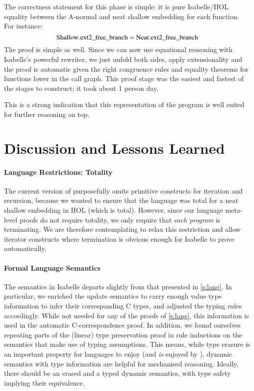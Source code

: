 \documentclass[9pt\ifFinal\else,preprint,nocopyrightspace\fi,\ifAlpha\else natbib,authoryear\fi]{sigplanconf}
\begin{document}
The correctness statement for this phase is simple: it is pure Isabelle/HOL
equality between the A-normal and neat shallow embedding for each function.
For instance:
$$\mathrm{Shallow.}\mathrm{ext2\_free\_branch} = \mathrm{Neat.}\mathrm{ext2\_free\_branch}$$
The proof is simple as well. Since we can now use equational reasoning with
Isabelle's powerful rewriter, we just unfold both sides, apply extensionality
and the proof is automatic given the right congruence rules and equality
theorems for functions lower in the call graph. This proof stage was the
easiest and fastest of the stages to construct; it took about 1 person day.

This is a strong indication that this representation of the program is well
suited for further reasoning on top.

\section{Discussion and Lessons Learned}\label{s:lessons}


\paragraph{Language Restrictions: Totality}
The current version of \CDSL purposefully omits primitive constructs for
iteration and recursion, because we wanted to ensure that the language was
total for a neat shallow embedding in HOL (which is total). However, since
our language meta-level proofs do not require totality, we only require that
\emph{each program} is terminating. We are therefore contemplating to relax
this restriction and allow \CDSL iterator constructs where termination is
obvious enough for Isabelle to prove automatically.

\paragraph{Formal Language Semantics}
The \CDSL semantics in Isabelle departs slightly from that presented in
\autoref{s:lang}. In particular, we enriched the update semantics to carry
enough value type information to infer their corresponding C types, and
adjusted the typing rules accordingly. While not needed for any of the
proofs of \autoref{s:lang}, this information is used in the automatic
C-correspondence proof.
In addition, we found ourselves repeating parts of the (linear) type
preservation proof in rule inductions on the semantics that make use of
typing assumptions. This means, while type erasure is an important
property for languages to enjoy (and \emph{is} enjoyed by \CDSL), dynamic
semantics with type information are helpful for mechanised
reasoning. Ideally, there should be an erased and a typed dynamic
semantics, with type safety implying their equivalence.
\end{document}
